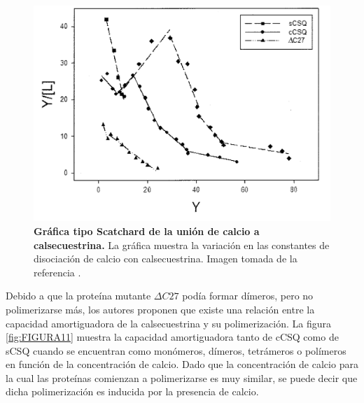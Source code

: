 \documentclass[draft]{article}
\begin{document}
\begin{figure}[h]
	\centering
	\includegraphics{FIGURA10}
	\caption{\textbf{Gráfica tipo Scatchard de la unión de calcio a calsecuestrina.} La gráfica muestra la variación en las constantes de disociación de calcio con calsecuestrina. Imagen tomada de la referencia \cite{Park2004a}.}
	\label{fig:FIGURA10}
\end{figure}

Debido a que la proteína mutante $\Delta C27$ podía formar dímeros, pero no polimerizarse más, los autores proponen que existe una relación entre la capacidad amortiguadora de la calsecuestrina y su polimerización. La figura \ref{fig:FIGURA11} muestra la capacidad amortiguadora tanto de cCSQ como de sCSQ cuando se encuentran como monómeros, dímeros, tetrámeros o polímeros en función de la concentración de calcio. Dado que la concentración de calcio para la cual las proteínas comienzan a polimerizarse es muy similar, se puede decir que dicha polimerización es inducida por la presencia de calcio. \\
\end{document}
